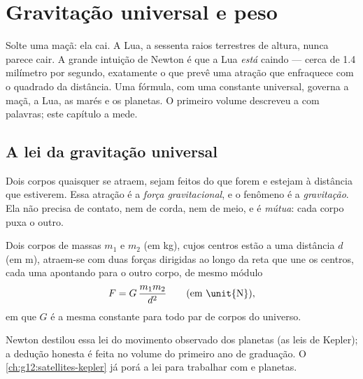 \chapter{Gravitação universal e peso}\label{ch:g10:universal-gravitation}

Solte uma maçã: ela cai. A Lua, a sessenta raios terrestres de altura,
nunca parece cair. A grande intuição de Newton é que a Lua \emph{está}
caindo --- cerca de 1.4 milímetro por segundo, exatamente o que prevê uma
atração que enfraquece com o quadrado da distância. Uma fórmula, com uma
constante universal, governa a maçã, a Lua, as marés e os planetas. O
primeiro volume descreveu a  com palavras; este capítulo a
mede.

\section{A lei da gravitação universal}

\begin{definition}\label{def:g10:universal-gravitation:force}
Dois corpos quaisquer se atraem, sejam feitos do que forem e estejam à
distância que estiverem. Essa atração é a \emph{força
gravitacional}, e o fenômeno é a
\emph{gravitação}. Ela não precisa de contato, nem de
corda, nem de meio, e é \emph{mútua}: cada corpo puxa o outro.
\end{definition}

\begin{theorem}\label{thm:g10:universal-gravitation:law}
Dois corpos de massas $m_1$ e $m_2$ (em \unit{kg}), cujos centros estão a
uma distância $d$ (em \unit{m}), atraem-se com duas forças dirigidas ao
longo da reta que une os centros, cada uma apontando para o outro corpo,
de mesmo módulo
\[
F = G\,\frac{m_1 m_2}{d^2}
\qquad \text{(em \unit{N})},
\]
em que $G$ é a mesma constante para todo par de corpos do universo.
\end{theorem}
\admitted

\begin{remark}
Newton destilou essa lei do movimento observado dos planetas (as leis de
Kepler); a dedução honesta é feita no volume do primeiro ano de
graduação. O \cref{ch:g12:satellites-kepler} já porá a lei para trabalhar
com  e planetas.
\end{remark}

